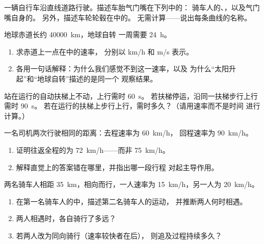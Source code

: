 \begin{exercise}[$\star\star$]\label{exo:g10:relative-motion:9}
一辆自行车沿直线道路行驶。描述车胎气门嘴在下列中的：
骑车人的、，以及气门嘴自身的。
另外，描述车轮轮毂在中的。
无需计算——说出每条曲线的名称。
\end{exercise}

\begin{exercise}[$\star\star$]\label{exo:g10:relative-motion:10}
地球赤道长约 \qty{40000}{km}，地球自转
一周需要 \qty{24}{h}。
\begin{enumerate}
  \item 求赤道上一点在中的速率，
        分别以 \unit{km/h} 和 \unit{m/s} 表示。
  \item 各用一句话解释：为什么我们感觉不到这一速率，以及
        为什么“太阳升起”和“地球自转”描述的是同一个
        观察结果。
\end{enumerate}
\end{exercise}

\begin{exercise}[$\star\star$]\label{exo:g10:relative-motion:11}
站在运行的自动扶梯上不动，上行需时 \qty{60}{s}。
若扶梯停运，沿同一扶梯步行上行需时 \qty{90}{s}。
若在运行的扶梯上步行上行，需时多久？（请用速率而不是时间
进行计算。）
\end{exercise}

\begin{exercise}[$\star\star\star$]\label{exo:g10:relative-motion:12}
一名司机两次行驶相同的距离：去程速率为 \qty{60}{km/h}，
回程速率为 \qty{90}{km/h}。
\begin{enumerate}
  \item 证明往返全程的为
        \qty{72}{km/h}——而非 \qty{75}{km/h}。
  \item 解释直觉上的答案错在哪里，并指出哪一段行程
        对起主导作用。
\end{enumerate}
\end{exercise}

\begin{exercise}[$\star\star\star$]\label{exo:g10:relative-motion:13}
两名骑车人相距 \qty{35}{km}，相向而行，一人速率为
\qty{15}{km/h}，另一人为 \qty{20}{km/h}。
\begin{enumerate}
  \item 在第一名骑车人的中，描述第二名骑车人的运动，
        并推断两人何时相遇。
  \item 两人相遇时，各自骑行了多远？
  \item 若两人改为同向骑行（速率较快者在后），
        则追及过程持续多久？
\end{enumerate}
\end{exercise}

